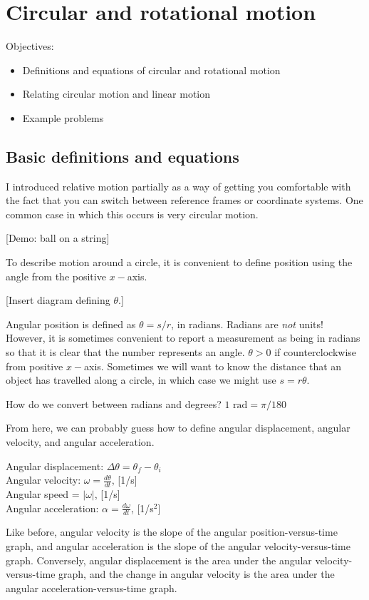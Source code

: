 \section{Circular and rotational motion}
Objectives:
\begin{itemize}
\item Definitions and equations of circular and rotational motion
\item Relating circular motion and linear motion  
\item Example problems
\end{itemize}
\hrulefill

\subsection{Basic definitions and equations}
I introduced relative motion partially as a way of getting you comfortable with the fact that you can switch between reference frames or coordinate systems. One common case in which this occurs is very circular motion.

[Demo: ball on a string]

To describe motion around a circle, it is convenient to define position using the angle from the positive $x-$axis.

[Insert diagram defining $\theta$.]
\vspace{5cm}

Angular position is defined as $\theta=s/r$, in radians. Radians are \textit{not} units! However, it is sometimes convenient to report a measurement as being in radians so that it is clear that the number represents an angle. $\theta>0$ if counterclockwise from positive $x-$axis. Sometimes we will want to know the distance that an object has travelled along a circle, in which case we might use $s=r\theta$.

How do we convert between radians and degrees? $1\mbox{ rad}=\pi/180$

From here, we can probably guess how to define angular displacement, angular velocity, and angular acceleration.

Angular displacement: $\Delta{\theta}=\theta_f-\theta_i$\\
Angular velocity: $\omega=\frac{d\theta}{d{t}}$, [1/s]\\
Angular speed = $|\omega|$, [1/s]\\
Angular acceleration: $\alpha=\frac{d\omega}{d{t}}$, [1/s$^2$]

Like before, angular velocity is the slope of the angular position-versus-time graph, and angular acceleration is the slope of the angular velocity-versus-time graph. Conversely, angular displacement is the area under the angular velocity-versus-time graph, and the change in angular velocity is the area under the angular acceleration-versus-time graph. 

